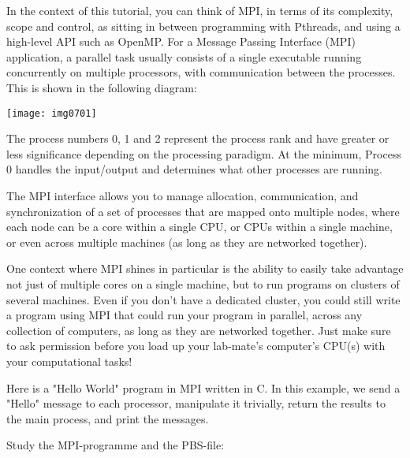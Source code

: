In the context of this tutorial, you can think of MPI, in terms of its
complexity, scope and control, as sitting in between programming with Pthreads,
and using a high-level API such as OpenMP. For a Message Passing Interface
(MPI) application, a parallel task usually consists of a single executable
running concurrently on multiple processors, with communication between the
processes.  This is shown in the following diagram:

\texttt{[image: img0701]}

The process numbers 0, 1 and 2 represent the process rank and have greater or
less significance depending on the processing paradigm. At the minimum, Process
0 handles the input/output and determines what other processes are running.

The MPI interface allows you to manage allocation, communication, and
synchronization of a set of processes that are mapped onto multiple nodes,
where each node can be a core within a single CPU, or CPUs within a single
machine, or even across multiple machines (as long as they are networked
together).

One context where MPI shines in particular is the ability to easily take
advantage not just of multiple cores on a single machine, but to run programs
on clusters of several machines. Even if you don't have a dedicated cluster,
you could still write a program using MPI that could run your program in
parallel, across any collection of computers, as long as they are networked
together. Just make sure to ask permission before you load up your lab-mate's
computer's CPU(s) with your computational tasks!

\begin{prompt}
\end{prompt}

Here is a "Hello World" program in MPI written in C. In this example, we send a
"Hello" message to each processor, manipulate it trivially, return the results
to the main process, and print the messages.

Study the MPI-programme and the PBS-file:


